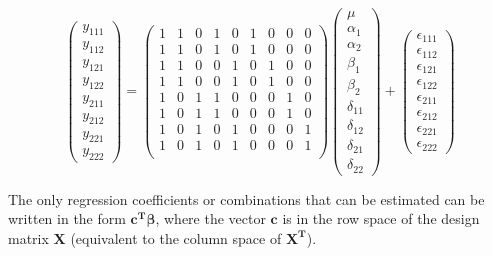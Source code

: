 \documentclass[11pt]{article}
\begin{document}
\[
\begin{pmatrix} y_{111} \\ y_{112} \\  y_{121}
\\ y_{122} \\ y_{211} \\ y_{212} \\ y_{221} \\ y_{222}
\end{pmatrix} =  
\begin{pmatrix}{}
  1 & 1 & 0 & 1 & 0 & 1 & 0 & 0 & 0 \\ 
  1 & 1 & 0 & 1 & 0 & 1 & 0 & 0 & 0 \\ 
  1 & 1 & 0 & 0 & 1 & 0 & 1 & 0 & 0 \\ 
  1 & 1 & 0 & 0 & 1 & 0 & 1 & 0 & 0 \\ 
  1 & 0 & 1 & 1 & 0 & 0 & 0 & 1 & 0 \\ 
  1 & 0 & 1 & 1 & 0 & 0 & 0 & 1 & 0 \\ 
  1 & 0 & 1 & 0 & 1 & 0 & 0 & 0 & 1 \\ 
  1 & 0 & 1 & 0 & 1 & 0 & 0 & 0 & 1 \\ 
  \end{pmatrix}
\begin{pmatrix}
\mu \\ \alpha_1 \\ \alpha_2 \\ 
\beta_1 \\ \beta_2 \\ 
\delta_11 \\ \delta_12 \\ \delta_21 \\ \delta_22
\end{pmatrix} +
\begin{pmatrix} \epsilon_{111} \\ \epsilon_{112} \\  \epsilon_{121}
\\ \epsilon_{122} \\ \epsilon_{211} \\ \epsilon_{212}
\\ \epsilon_{221} \\ \epsilon_{222} \end{pmatrix}
\]

The only regression coefficients or combinations that can be estimated 
can be written in the form $\mathbf{c^T\beta}$, where the vector 
$\mathbf{c}$ is in the row space of the design matrix $\mathbf{X}$ 
(equivalent to the column space of $\mathbf{X^T}$).
\end{document}
